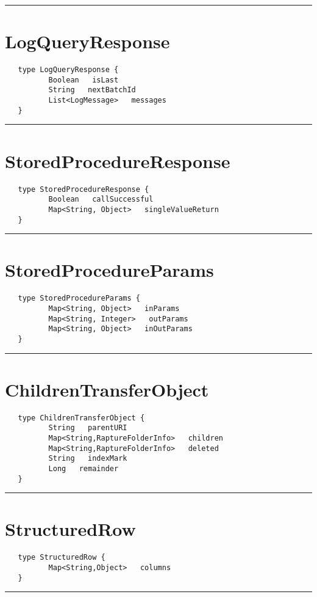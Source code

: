 \rule{12cm}{2pt}
\section{LogQueryResponse}
\label{type:LogQueryResponse}

\begin{Verbatim}
   type LogQueryResponse {
          Boolean   isLast
          String   nextBatchId
          List<LogMessage>   messages
   }
\end{Verbatim}

\rule{12cm}{2pt}
\section{StoredProcedureResponse}
\label{type:StoredProcedureResponse}

\begin{Verbatim}
   type StoredProcedureResponse {
          Boolean   callSuccessful
          Map<String, Object>   singleValueReturn
   }
\end{Verbatim}

\rule{12cm}{2pt}
\section{StoredProcedureParams}
\label{type:StoredProcedureParams}

\begin{Verbatim}
   type StoredProcedureParams {
          Map<String, Object>   inParams
          Map<String, Integer>   outParams
          Map<String, Object>   inOutParams
   }
\end{Verbatim}

\rule{12cm}{2pt}
\section{ChildrenTransferObject}
\label{type:ChildrenTransferObject}

\begin{Verbatim}
   type ChildrenTransferObject {
          String   parentURI
          Map<String,RaptureFolderInfo>   children
          Map<String,RaptureFolderInfo>   deleted
          String   indexMark
          Long   remainder
   }
\end{Verbatim}

\rule{12cm}{2pt}
\section{StructuredRow}
\label{type:StructuredRow}

\begin{Verbatim}
   type StructuredRow {
          Map<String,Object>   columns
   }
\end{Verbatim}

\rule{12cm}{2pt}
